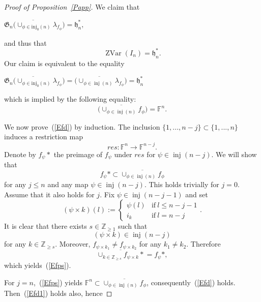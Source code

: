 \documentclass{emsprocart}
\begin{document}
\begin{proof}[Proof of Proposition~\ref{Papp}]
We claim that
\begin{center}$\overline{\mathfrak
G_n(\cup_{\phi\in\operatorname{inj_0}(n)}\lambda_{f_\phi}})=\mathfrak
h_n^*,$%
\end{center}and thus
that\begin{equation}\operatorname{ZVar}(I_n)=\mathfrak
h_n^*.\label{Efd1}\end{equation} Our claim is
equivalent to the equality \begin{center}$\overline{\mathfrak
G_n(\cup_{\phi\in\operatorname{inj_0}(n)}\lambda_{f_\phi}})=\overline{(\cup_{\phi\in\operatorname{inj}(n)}\lambda_{f_\phi}})=\mathfrak
h_n^*$%
\end{center} which is
implied by the following
equality:\begin{equation}\overline{(\cup_{\phi\in\operatorname{inj}(n)}f_\phi})=\mathbb F^n\label{Efd}.\end{equation}

We now prove~(\ref{Efd}) by
induction. The inclusion $\{1,..., n-j\}\subset\{1,..., n\}$ induces a restriction map $$res: \mathbb F^n\to \mathbb F^{n-j}.$$ Denote by $f_\psi*$ the preimage of $f_\psi$ under
$res$ for $\psi\in\operatorname{inj}(n-j)$. %
We will show that %
\begin{equation}f_\psi*\subset\overline{\cup_{\phi\in
\operatorname{inj}(n)}f_\phi}\label{Efps}\end{equation}for any  $j\le n$ and any map $\psi\in\operatorname{inj}(n-j)$. This holds trivially for $j=0$. Assume that it also holds for $j$.
Fix $\psi\in \operatorname{inj}(n-j-1)$ and set
$$(\psi\times k)(l):=\begin{cases}\psi(l)&\mbox{if}~l\le n-j-1\\i_k&\mbox{if}~l=n-j\end{cases}.$$
It is clear that there exists $s\in\mathbb Z_{\ge1}$ such that
$$(\psi\times k)\in\operatorname{inj}(n-j)$$ for any $k\in\mathbb Z_{\ge s}$.
Moreover, $f_{\psi\times k_1}\ne f_{\psi\times k_2}$ for any $k_1\ne k_2$.
Therefore$$\overline{\cup_{k\in\mathbb Z_{\ge s}}f_{\psi\times
k}*}=f_\psi*,$$which yields~(\ref{Efps}).


For $j=n$,~(\ref{Efps}) yields $\mathbb F^n\subset \overline{\cup_{\phi\in
\operatorname{inj}(n)}f_\phi}$, consequently~(\ref{Efd}) holds. Then~(\ref{Efd1}) holds also, hence



\end{proof}
\end{document}
